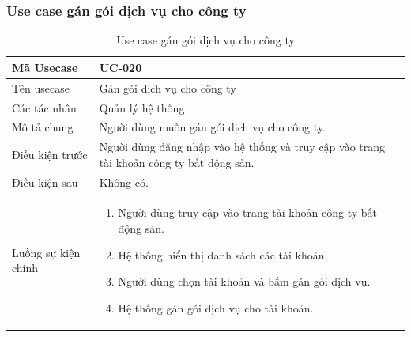 \documentclass[12pt,a4paper]{article}
\begin{document}
    \subsubsection*{Use case gán gói dịch vụ cho công ty}
    \begin{table}[H]
        \centering
        \begin{tabular}{|p{3.5cm}|p{11.5cm}|c|}
            \hline
            Mã Usecase      & UC-020                                                                                  \\
            \hline
            Tên usecase     & Gán gói dịch vụ cho công ty                                                             \\
            \hline
            Các tác nhân    & Quản lý hệ thống                                                                        \\
            \hline
            Mô tả chung     & Người dùng muốn gán gói dịch vụ cho công ty.                                            \\
            \hline

            Điều kiện trước & Người dùng đăng nhập vào hệ thống và truy cập vào trang tài khoản công ty bất động sản. \\
            \hline

            Điều kiện sau   & Không có.                                                                               \\
            \hline

            Luồng sự kiện chính & \vspace{-.8cm}\begin{enumerate}
                                                    \item Người dùng truy cập vào trang tài khoản công ty bất động sản.
                                                    \item Hệ thống hiển thị danh sách các tài khoản.
                                                    \item Người dùng chọn tài khoản và bấm gán gói dịch vụ.
                                                    \item Hệ thống gán gói dịch vụ cho tài khoản.
            \end{enumerate}
            \\
            \hline
        \end{tabular}
        \caption{Use case gán gói dịch vụ cho công ty}

    \end{table}
\end{document}
